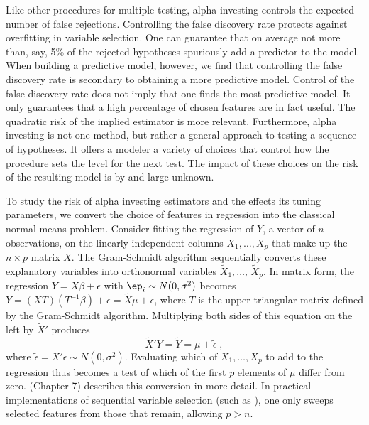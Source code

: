 \documentclass{gSCS2e}
\begin{document}
 Like other procedures for multiple testing, alpha investing controls the expected number
 of false rejections.  Controlling the false discovery rate protects against overfitting
 in variable selection.  One can guarantee that on average not more than, say, 5\% of the
 rejected hypotheses spuriously add a predictor to the model.  When building a predictive
 model, however, we find that controlling the false discovery rate is secondary to
 obtaining a more predictive model.  Control of the false discovery rate does not imply
 that one finds the most predictive model.  It only guarantees that a high percentage of
 chosen features are in fact useful.  The quadratic risk of the implied estimator is more
 relevant.  Furthermore, alpha investing is not one method, but rather a general approach
 to testing a sequence of hypotheses.  It offers a modeler a variety of choices that control
 how the procedure sets the level for the next test. The impact of these choices on the
 risk of the resulting model is by-and-large unknown.


 To study the risk of alpha investing estimators and the effects its tuning parameters, we
 convert the choice of features in regression into the classical normal means problem.
  Consider fitting the regression of $Y$, a vector of $n$ observations, on the linearly
 independent columns $X_1,\ldots,X_p$ that make up the $n\times p$ matrix $X$.  The
 Gram-Schmidt algorithm sequentially converts these explanatory variables into orthonormal
 variables $\tilde{X}_1,\ldots,\,\tilde{X}_p$.  In matrix form, the regression $Y = X
 \beta + \epsilon$ with $\ep_i \sim N(0,\sigma^2)$ becomes $Y = (X T)( T^{-1}\beta) +
 \epsilon = \tilde{X} \mu + \epsilon$, where $T$ is the upper triangular matrix defined by
 the Gram-Schmidt algorithm.  Multiplying both sides of this equation on the left by
 $\tilde{X}'$ produces
\begin{equation*}
   \tilde{X}'Y =  \tilde{Y}  = \mu + \tilde \epsilon \;,
\end{equation*}
 where $\tilde\epsilon = X'\epsilon \sim N(0,\sigma^2)$.  Evaluating which of
 $X_1,\ldots,X_p$ to add to the regression thus becomes a test of which of the first $p$
 elements of $\mu$ differ from zero.  \citet{lehmann05} (Chapter 7) describes this
 conversion in more detail. In practical implementations of sequential variable selection
 (such as \cite{fosterlin11}), one only sweeps selected features from those that remain,
 allowing $p > n$.
 
\end{document}
